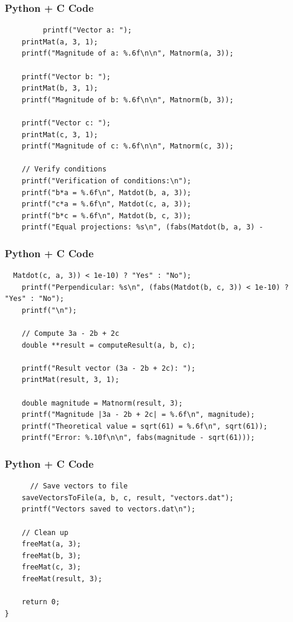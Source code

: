 \documentclass{beamer}
\begin{document}
\begin{frame}[fragile]
    \frametitle{Python + C Code}
    \begin{lstlisting}
         printf("Vector a: ");
    printMat(a, 3, 1);
    printf("Magnitude of a: %.6f\n\n", Matnorm(a, 3));
    
    printf("Vector b: ");
    printMat(b, 3, 1);
    printf("Magnitude of b: %.6f\n\n", Matnorm(b, 3));
    
    printf("Vector c: ");
    printMat(c, 3, 1);
    printf("Magnitude of c: %.6f\n\n", Matnorm(c, 3));
    
    // Verify conditions
    printf("Verification of conditions:\n");
    printf("b*a = %.6f\n", Matdot(b, a, 3));
    printf("c*a = %.6f\n", Matdot(c, a, 3));
    printf("b*c = %.6f\n", Matdot(b, c, 3));
    printf("Equal projections: %s\n", (fabs(Matdot(b, a, 3) - 
    \end{lstlisting}
\end{frame}

\begin{frame}[fragile]
    \frametitle{Python + C Code}
    \begin{lstlisting}
  Matdot(c, a, 3)) < 1e-10) ? "Yes" : "No");
    printf("Perpendicular: %s\n", (fabs(Matdot(b, c, 3)) < 1e-10) ? "Yes" : "No");
    printf("\n");
    
    // Compute 3a - 2b + 2c
    double **result = computeResult(a, b, c);
    
    printf("Result vector (3a - 2b + 2c): ");
    printMat(result, 3, 1);
    
    double magnitude = Matnorm(result, 3);
    printf("Magnitude |3a - 2b + 2c| = %.6f\n", magnitude);
    printf("Theoretical value = sqrt(61) = %.6f\n", sqrt(61));
    printf("Error: %.10f\n\n", fabs(magnitude - sqrt(61)));
    \end{lstlisting}
\end{frame}

\begin{frame}[fragile]
    \frametitle{Python + C Code}
    \begin{lstlisting}
      // Save vectors to file
    saveVectorsToFile(a, b, c, result, "vectors.dat");
    printf("Vectors saved to vectors.dat\n");
    
    // Clean up
    freeMat(a, 3);
    freeMat(b, 3);
    freeMat(c, 3);
    freeMat(result, 3);
    
    return 0;
}
    \end{lstlisting}
\end{frame}
\end{document}

